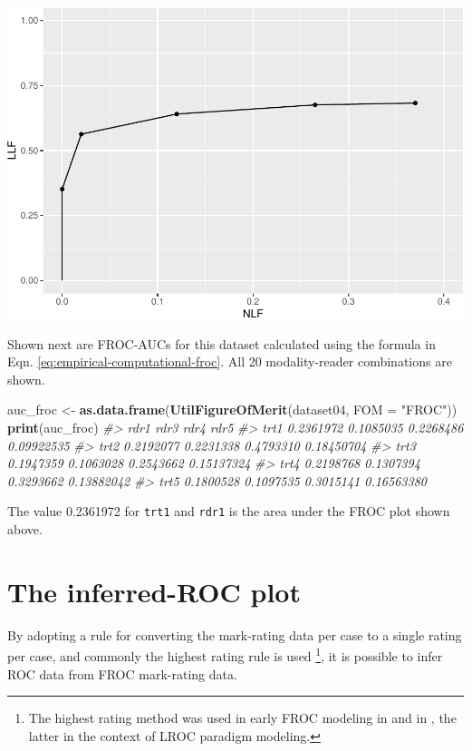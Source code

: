 \documentclass[
]{book}
\newenvironment{Shaded}{\begin{snugshade}}{\end{snugshade}}
\newcommand{\CommentTok}[1]{\textcolor[rgb]{0.56,0.35,0.01}{\textit{#1}}}
\newcommand{\DataTypeTok}[1]{\textcolor[rgb]{0.13,0.29,0.53}{#1}}
\newcommand{\KeywordTok}[1]{\textcolor[rgb]{0.13,0.29,0.53}{\textbf{#1}}}
\newcommand{\NormalTok}[1]{#1}
\newcommand{\StringTok}[1]{\textcolor[rgb]{0.31,0.60,0.02}{#1}}
\begin{document}
\includegraphics{03-empirical_files/figure-latex/unnamed-chunk-1-1.pdf}

Shown next are FROC-AUCs for this dataset calculated using the formula in Eqn. \eqref{eq:empirical-computational-froc}. All 20 modality-reader combinations are shown.

\begin{Shaded}
\begin{Highlighting}[]
\NormalTok{auc_froc <-}\StringTok{ }\KeywordTok{as.data.frame}\NormalTok{(}\KeywordTok{UtilFigureOfMerit}\NormalTok{(dataset04, }\DataTypeTok{FOM =} \StringTok{"FROC"}\NormalTok{))}
\KeywordTok{print}\NormalTok{(auc_froc)}
\CommentTok{#>           rdr1      rdr3      rdr4       rdr5}
\CommentTok{#> trt1 0.2361972 0.1085035 0.2268486 0.09922535}
\CommentTok{#> trt2 0.2192077 0.2231338 0.4793310 0.18450704}
\CommentTok{#> trt3 0.1947359 0.1063028 0.2543662 0.15137324}
\CommentTok{#> trt4 0.2198768 0.1307394 0.3293662 0.13882042}
\CommentTok{#> trt5 0.1800528 0.1097535 0.3015141 0.16563380}
\end{Highlighting}
\end{Shaded}

The value 0.2361972 for \texttt{trt1} and \texttt{rdr1} is the area under the FROC plot shown above.

\hypertarget{empirical-ROC}{%
\section{The inferred-ROC plot}\label{empirical-ROC}}

By adopting a rule for converting the mark-rating data per case to a single rating per case, and commonly the highest rating rule is used \footnote{The highest rating method was used in early FROC modeling in \citep{bunch1977free} and in \citep{swensson1996unified}, the latter in the context of LROC paradigm modeling.}, it is possible to infer ROC data from FROC mark-rating data.
\end{document}
